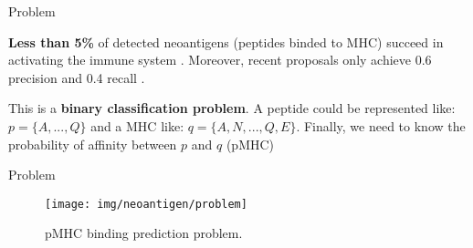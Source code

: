 \documentclass[10pt]{beamer}
\newcommand{\1}{
	\setbeamertemplate{background}{
		\texttt{[image: img/1]}
		\tikz[overlay] \fill[fill opacity=0.75,fill=white] (0,0) rectangle (-\paperwidth,\paperheight);
	}
}
\begin{document}
\begin{frame}{Problem}{}
	
	\begin{block}{}
		\textbf{Less than 5\%} of detected neoantigens (peptides binded to MHC) succeed in activating the immune system \cite{de2020neoantigen}. Moreover, recent proposals only achieve 0.6 precision and 0.4 recall \cite{mill2022neoms}.
	\end{block}
			
			
	\begin{block}{}
		This is a \textbf{binary classification problem}. A peptide could be represented like: $p = \{ A, ... , Q \}$ and a MHC like: $q = \{ A, N, ... ,Q, E \}$. Finally, we need to know the probability of affinity between $p$ and $q$ (pMHC)
	\end{block}
	
	
\end{frame}

\begin{frame}{Problem}{}	
	\begin{figure}
			\texttt{[image: img/neoantigen/problem]}
			\caption{pMHC binding prediction problem.}
		\end{figure}
\end{frame}


\end{document}

